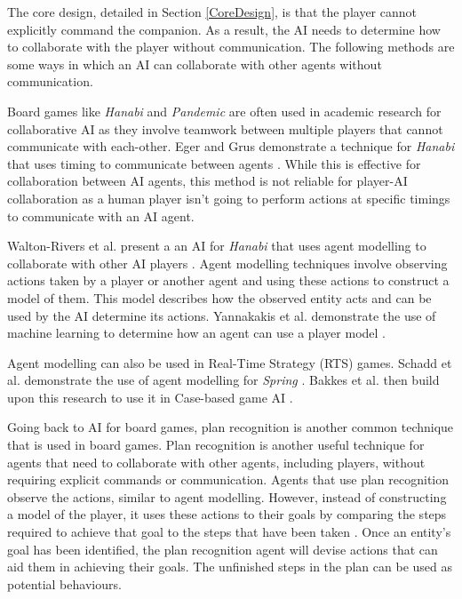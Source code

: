 \documentclass{IEEEtran}
\begin{document}
The core design, detailed in Section \ref{CoreDesign}, is that the player cannot explicitly command the companion. As a result, the AI needs to determine how to collaborate with the player without communication. The following methods are some ways in which an AI can collaborate with other agents without communication.

Board games like \textit{Hanabi} and \textit{Pandemic} are often used in academic research for collaborative AI as they involve teamwork between multiple players that cannot communicate with each-other. Eger and Grus demonstrate a technique for \textit{Hanabi} that uses timing to communicate between agents \cite{WaitASecond2019}. While this is effective for collaboration between AI agents, this method is not reliable for player-AI collaboration as a human player isn't going to perform actions at specific timings to communicate with an AI agent.

Walton-Rivers et al. present a an AI for \textit{Hanabi} that uses agent modelling to collaborate with other AI players \cite{EvaluatingHanabiAgents}. Agent modelling techniques involve observing actions taken by a player or another agent and using these actions to construct a model of them. This model describes how the observed entity acts and can be used by the AI determine its actions. Yannakakis et al. demonstrate the use of machine learning to determine how an agent can use a player model \cite{yannakakis2013playermodelling}.

Agent modelling can also be used in Real-Time Strategy (RTS) games. Schadd et al. demonstrate the use of agent modelling for \textit{Spring} \cite{OpponentModellingRTS2007}. Bakkes et al. then build upon this research to use it in Case-based game AI \cite{bakkes2009opponentmodelling}.


Going back to AI for board games, plan recognition is another common technique that is used in board games. Plan recognition is another useful technique for agents that need to collaborate with other agents, including players, without requiring explicit commands or communication. Agents that use plan recognition observe the actions, similar to agent modelling. However, instead of constructing a model of the player, it uses these actions to their goals by comparing the steps required to achieve that goal to the steps that have been taken \cite{GeneratingCollabBehaviourPlanRecognition2016}. Once an entity’s goal has been identified, the plan recognition agent will devise actions that can aid them in achieving their goals. The unfinished steps in the plan can be used as potential behaviours.
\end{document}
